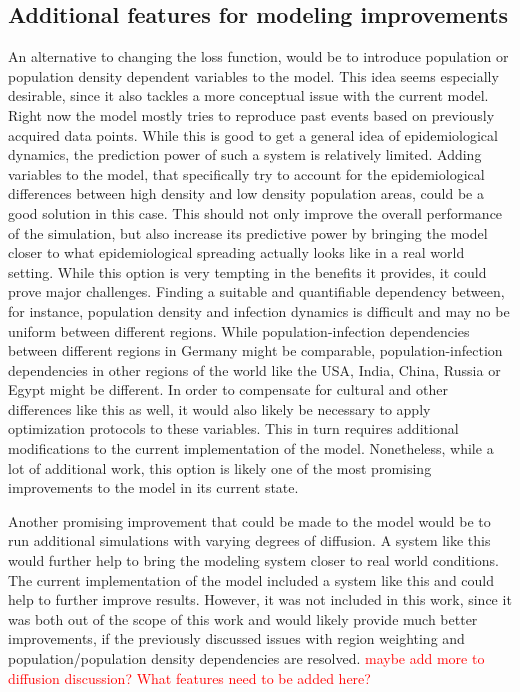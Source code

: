 \subsection{Additional features for modeling improvements}
An alternative to changing the loss function, would be to introduce population or population density dependent variables
to the model. This idea seems especially desirable, since it also tackles a more conceptual issue with the current model. Right
now the model mostly tries to reproduce past events based on previously acquired data points. While this is good to get a general
idea of epidemiological dynamics, the prediction power of such a system is relatively limited. Adding variables to the model,
that specifically try to account for the epidemiological differences between high density and low density population areas, could
be a good solution in this case. This should not only improve the overall performance of the simulation, but also increase its 
predictive power by bringing the model closer to what epidemiological spreading actually looks like in a real world setting.
While this option is very tempting in the benefits it provides, it could prove major challenges. Finding a suitable and quantifiable
dependency between, for instance, population density and infection dynamics is difficult and may no be uniform between different
regions. While population-infection dependencies between different regions in Germany might be comparable, population-infection
dependencies in other regions of the world like the USA, India, China, Russia or Egypt might be different. In order to compensate
for cultural and other differences like this as well, it would also likely be necessary to apply optimization protocols to these
variables. This in turn requires additional modifications to the current implementation of the model. Nonetheless, while a lot of
additional work, this option is likely one of the most promising improvements to the model in its current state.\newline 

Another promising improvement that could be made to the model would be to run additional simulations with varying degrees of
diffusion. A system like this would further help to bring the modeling system closer to real world conditions. The current
implementation of the model included a system like this and could help to further improve results. However, it was not included
in this work, since it was both out of the scope of this work and would likely provide much better improvements, if the
previously discussed issues with region weighting and population/population density dependencies are resolved.
\textcolor{red}{maybe add more to diffusion discussion? What features need to be added here?}


